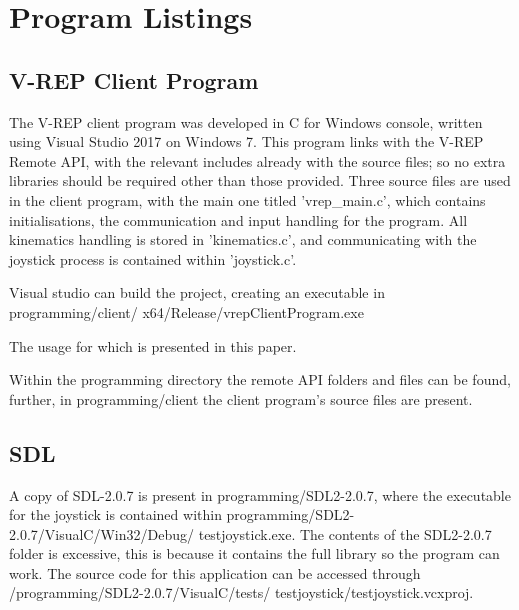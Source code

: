 \documentclass[12pt,openany,a4paper]{book}
\begin{document}
{%
%

\chapter{Program Listings}

\section{V-REP Client Program}
The V-REP client program was developed in C for Windows console, written using Visual Studio 2017 on Windows 7. This program links with the V-REP Remote API, with the relevant includes already with the source files; so no extra libraries should be required other than those provided. Three source files are used in the client program, with the main one titled 'vrep\_main.c', which contains initialisations, the communication and input handling for the program. All kinematics handling is stored in 'kinematics.c', and communicating with the joystick process is contained within 'joystick.c'.

Visual studio can build the project, creating an executable in programming/client/
x64/Release/vrepClientProgram.exe

The usage for which is presented in this paper.

Within the programming directory the remote API folders and files can be found, further, in programming/client the client program's source files are present.


\section{SDL}
A copy of SDL-2.0.7 is present in programming/SDL2-2.0.7, where the executable for the joystick is contained within programming/SDL2-2.0.7/VisualC/Win32/Debug/
testjoystick.exe. The contents of the SDL2-2.0.7 folder is excessive, this is because it contains the full library so the program can work. The source code for this application can be accessed through /programming/SDL2-2.0.7/VisualC/tests/
testjoystick/testjoystick.vcxproj.

}
\end{document}
